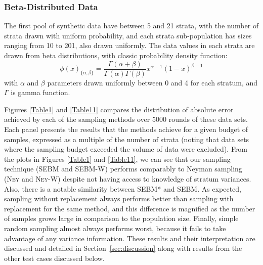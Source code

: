 \subsubsection{Beta-Distributed Data}
The first pool of synthetic data %
have between 5 and 21 strata, with the number of strata drawn with uniform probability, 
and each strata sub-population has sizes ranging from 10 to 201, also drawn uniformly.
The data values in each strata are drawn from beta distributions, with classic probability density function:
$$\phi(x)_{\{\alpha,\beta\}}
=\frac{\Gamma(\alpha+\beta)}{\Gamma(\alpha)\Gamma(\beta)}     
    x^{\alpha-1}(1-x)^{\beta-1} $$
with $\alpha$ and $\beta$ parameters drawn uniformly between 0 and 4 for each stratum, and $\Gamma$ is gamma function.










Figures \ref{Table1} and \ref{Table11} compares the distribution of absolute error achieved by each of the sampling methods over 5000 rounds of these data sets.
Each panel presents the results that the methods achieve for a given budget of samples, 
expressed as a multiple of the number of strata (noting that data sets where the sampling budget exceeded the volume of data were excluded).
From the plots in Figures \ref{Table1} and \ref{Table11}, we can see that our sampling technique (SEBM and SEBM-W) performs comparably to
Neyman sampling (\textsc{Ney} and \textsc{Ney-W}) despite not having access to knowledge of stratum variances.
Also, there is a notable similarity between SEBM* and SEBM.
As expected, sampling without replacement always performs better than sampling with replacement for the same method, and this difference is magnified as the number of samples grows large in comparison to the population size. 
Finally, simple random sampling almost always performs worst, because it fails to take advantage of any variance information.
These results and their interpretation are discussed and detailed in Section~\ref{sec:discussion} along with results from the other test cases discussed below.



